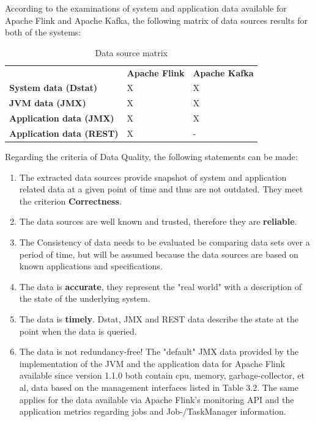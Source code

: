 According to the examinations of system and application data available for Apache Flink and Apache Kafka,
the following matrix of data sources results for both of the systems:

\begin{table}[H]
\begin{tabular}{lll}
 & \textbf{Apache Flink} & \textbf{Apache Kafka} \\
\textbf{System data (Dstat)} & X & X \\
\textbf{JVM data (JMX)} & X & X \\
\textbf{Application data (JMX)} & X & X \\
\textbf{Application data (REST)} & X & - \\
\end{tabular}
\caption{Data source matrix}
\label{data-source-matrix}
\end{table}

Regarding the criteria of Data Quality, the following statements can be made:

\begin{enumerate}
    \item The extracted data sources provide snapshot of system and application related data at a
    given point of time and thus are not outdated. They meet the criterion \textbf{Correctness}.
    \item The data sources are well known and trusted, therefore they are \textbf{reliable}.
    \item The Consistency of data needs to be evaluated be comparing data sets over a period of time,
    but will be assumed because the data sources are based on known applications and specifications.
    \item The data is \textbf{accurate}, they represent the "real world" with a description of the state of the
    underlying system.
    \item The data is \textbf{timely}. Dstat, JMX and REST data describe the state at the point when the data is
    queried.
    \item The data is not redundancy-free! The "default" JMX data provided by the implementation of the JVM and the
    application data for Apache Flink available since version 1.1.0 both contain cpu, memory, garbage-collector, et al,
    data based on the management interfaces listed in Table 3.2. The same applies for the data available via Apache Flink's
    monitoring API and the application metrics regarding jobs and Job-/TaskManager information.
\end{enumerate}


